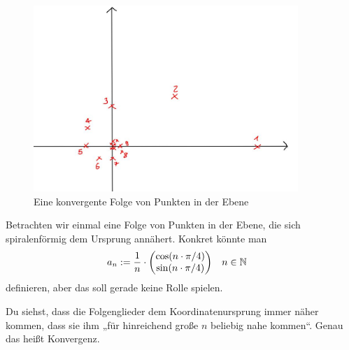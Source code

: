 \begin{bem}[Intuition]
    \begin{figure}[ht]
        \includegraphics[width=10cm]{./_img/Spirale.jpeg}
        \centering \caption{Eine konvergente Folge von Punkten in der Ebene}
    \end{figure}
    Betrachten wir einmal eine Folge von Punkten in der Ebene, die sich spiralenförmig dem Ursprung annähert. Konkret könnte man
    \begin{align*}
        a_n & := \frac{1}{n}\cdot \begin{pmatrix}
            \cos(n\cdot \pi/4) \\
            \sin(n\cdot \pi/4)
        \end{pmatrix} && n\in \mathbb N
    \end{align*}
    definieren, aber das soll gerade keine Rolle spielen.
    
    Du siehst, dass die Folgenglieder dem Koordinatenursprung immer näher kommen, dass sie ihm „für hinreichend große $n$ beliebig nahe kommen“. Genau das heißt Konvergenz.
\end{bem}



